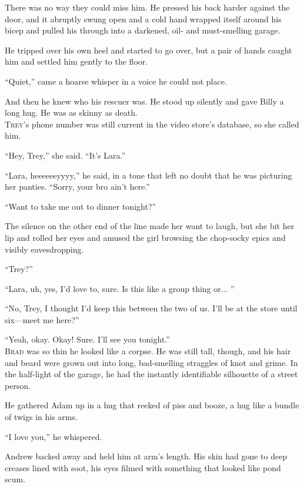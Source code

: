 There was no way they could miss him.  He pressed his back harder
against the door, and it abruptly swung open and a cold hand wrapped
itself around his bicep and pulled his through into a darkened, oil-
and must-smelling garage.

He tripped over his own heel and started to go over, but a pair of
hands caught him and settled him gently to the floor.

``Quiet,'' came a hoarse whisper in a voice he could not place.

And then he knew who his rescuer was.  He stood up silently and gave
Billy a long hug.  He was as skinny as death.
\\
\lettrine[lines=3, lhang=.5, nindent=0pt, findent=2pt]{T}{rey}'s phone number was still current in the video store's database,
so she called him.

``Hey, Trey,'' she said.  ``It's Lara.''

``Lara, heeeeeeyyyy,'' he said, in a tone that left no doubt that he
was picturing her panties.  ``Sorry, your bro ain't here.''

``Want to take me out to dinner tonight?''

The silence on the other end of the line made her want to laugh, but
she bit her lip and rolled her eyes and amused the girl browsing the
chop-socky epics and visibly eavesdropping.

``Trey?''

``Lara, uh, yes, I'd love to, sure.  Is this like a group thing or... 
''

``No, Trey, I thought I'd keep this between the two of us.  I'll be at
the store until six---meet me here?''

``Yeah, okay.  Okay!  Sure.  I'll see you tonight.''
\\
\lettrine[lines=3, lhang=.5, nindent=0pt, findent=2pt]{B}{rad} was so thin he looked like a corpse.  He was still tall, though,
and his hair and beard were grown out into long, bad-smelling
straggles of knot and grime.  In the half-light of the garage, he had
the instantly identifiable silhouette of a street person.

He gathered Adam up in a hug that reeked of piss and booze, a hug like
a bundle of twigs in his arms.

``I love you,'' he whispered.

Andrew backed away and held him at arm's length.  His skin had gone to
deep creases lined with soot, his eyes filmed with something that
looked like pond scum.

